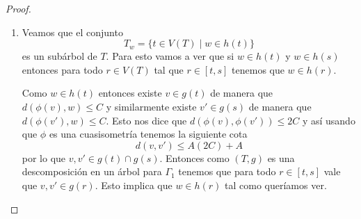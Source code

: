 \documentclass[tesis.tex]{subfiles}
\begin{document}
\begin{proof}
\begin{enumerate}[T1.]
		\item Veamos que el conjunto 
		\[
			T_{w} = \{ t \in V(T) \mid w \in h(t)   \}
		\]
		es un subárbol de $T$.
		Para esto vamos a ver que si $w \in h(t)$ y $w \in h(s)$ entonces para todo $r \in V(T)$ tal que $r \in [t,s]$ tenemos que $w \in h(r)$.
		
		Como $w \in h(t)$ entonces existe $v \in g(t)$ de manera que $d(\phi(v),w) \le C$ y similarmente existe $v' \in g(s)$ de manera que $d(\phi(v'),w) \le C$.
		Esto nos dice que 
		$ d(\phi(v), \phi(v')) \le 2C$
		y así usando que $\phi$ es una cuasisometría tenemos la siguiente cota
		\[
			d(v,v') \le A(2C)+A
		\]
		por lo que $v,v' \in g(t) \cap g(s)$.
		Entonces como $(T,g)$ es una descomposición en un árbol para $\Gamma_{1}$ tenemos que para todo $r \in [t,s]$ vale que $v,v' \in g(r)$.
		Esto implica que $w \in h(r)$ tal como queríamos ver.
	\end{enumerate}
	
\end{proof}
\end{document}
